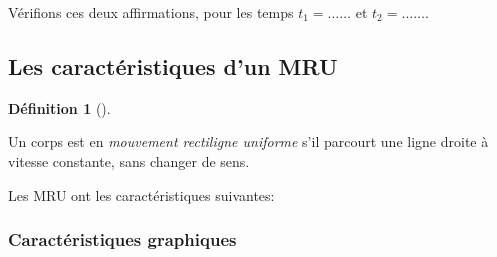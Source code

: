 \documentclass[
  a4paper,
  DIV=11,
  numbers=noendperiod,
  sans]{scrartcl}
\theoremstyle{definition}
\theoremstyle{definition}
\newtheorem{definition}{Définition}[section]
\theoremstyle{remark}
\begin{document}
Vérifions ces deux affirmations, pour les temps \(t_1=\ldots\ldots\) et
\(t_2=\ldots\ldots\).

\newpage{}

\subsection{Les caractéristiques d'un
MRU}\label{les-caractuxe9ristiques-dun-mru}

\begin{definition}[]\protect\hypertarget{def-mru}{}\label{def-mru}

Un corps est en \emph{mouvement rectiligne uniforme} s'il parcourt une
ligne droite à vitesse constante, sans changer de sens.

\end{definition}

Les MRU ont les caractéristiques suivantes:

\subsubsection{Caractéristiques
graphiques}\label{caractuxe9ristiques-graphiques}
\end{document}
